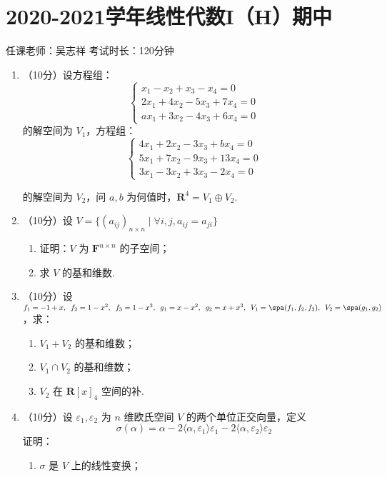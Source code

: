 \section{2020-2021学年线性代数I（H）期中}

\begin{center}
    任课老师：吴志祥\hspace{4em} 考试时长：120分钟
\end{center}
\begin{enumerate}
    \item （10分）设方程组：
    \[\begin{cases}
        x_1-x_2+x_3-x_4=0 \\ 2x_1+4x_2-5x_3+7x_4=0\\ax_1+3x_2-4x_3+6x_4=0
    \end{cases}\]
    的解空间为 $V_1$，方程组：
    \[\begin{cases}
        4x_1+2x_2-3x_3+bx_4=0 \\ 5x_1+7x_2-9x_3+13x_4=0\\3x_1-3x_2+3x_3-2x_4=0
    \end{cases}\]

    的解空间为 $V_2$，问 $a,b$ 为何值时，$\mathbf{R}^4=V_1 \oplus V_2$.
	\item （10分）设 $V=\{(a_{ij})_{n \times n} \mid \forall i, j, a_{ij}=a_{ji}\}$
    \begin{enumerate}
        \item 证明：$V$ 为 $\mathbf{F}^{n \times n}$ 的子空间；

        \item 求 $V$ 的基和维数.
    \end{enumerate}
	\item （10分）设 $f_1=-1+x,\enspace\allowbreak f_2=1-x^2,\enspace\allowbreak f_3=1-x^3,\enspace\allowbreak g_1=x-x^2,\enspace\allowbreak g_2=x+x^3,\enspace\allowbreak V_1=\spa(f_1, f_2, f_3),\enspace\allowbreak V_2=\spa(g_1, g_2)$，求：
    \begin{enumerate}
        \item $V_1+V_2$ 的基和维数；

        \item $V_1 \cap V_2$ 的基和维数；

        \item $V_2$ 在 $\mathbf{R}[x]_4$ 空间的补.
    \end{enumerate}
	\item （10分）设 $\varepsilon_1, \varepsilon_2$ 为 $n$ 维欧氏空间 $V$ 的两个单位正交向量，定义
    \[\sigma(\alpha)=\alpha-2\langle\alpha,\varepsilon_1\rangle\varepsilon_1-2\langle\alpha,\varepsilon_2\rangle\varepsilon_2\]
    证明：
    \begin{enumerate}
        \item $\sigma$ 是 $V$ 上的线性变换；


\end{enumerate}
\end{enumerate}
